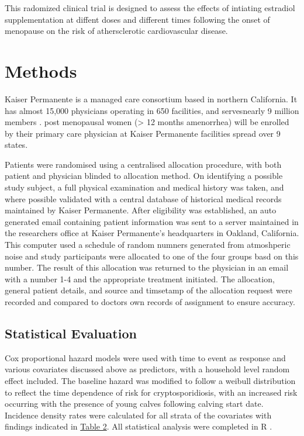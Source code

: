 \documentclass[12pt]{article}
\begin{document}
		This radomized clinical trial is designed to assess the effects of intiating estradiol supplementation at diffent doses and different times following the onset of menopause on the risk of athersclerotic cardiovascular disease.
		


	\section{Methods} 
		Kaiser Permanente is a managed care consortium based in northern California. It has almost 15,000 physicians operating in 650 facilities, and servesnearly 9 million members \cite{Rauber}.
		post menopausal women (> 12 months amenorrhea) will be enrolled by their primary care physician at Kaiser Permanente facilities spread over 9 states.

		Patients were randomised using a centralised allocation procedure, with both patient and physician blinded to allocation method. 
		On identifying a possible study subject, a full physical examination and medical history was taken, and where possible validated with a central database of historical medical records maintained by Kaiser Permanente.
		After eligibility was established, an auto generated email containing patient information was sent to a server maintained in the researchers office at Kaiser Permanente's headquarters in Oakland, California. 
		This computer used a schedule of random numners generated from atmoshperic noise \cite{Eddelbuettel2009}  and study participants were allocated to one of the four groups basd on this number.
		The result of this allocation was returned to the physician in an email with a number 1-4 and the appropriate treatment initiated.
		The allocation, general patient details, and source and timsetamp of the allocation request were recorded and compared to doctors own records of assignment to ensure accuracy.

	\subsection{Statistical Evaluation}
		Cox proportional hazard models were used with time to event as response and various covariates discussed above as predictors, with a household level random effect included.
		The baseline hazard was modified to follow a weibull distribution to reflect the time dependence of risk for cryptosporidiosis, with an increased risk occurring with the presence of young calves following calving start date. 
		Incidence density rates were calculated for all strata of the covariates with findings indicated in \hyperref[table2]{Table 2}.
		All statistical analysis were completed in R \cite{RCoreTeam2012}.
\end{document}
